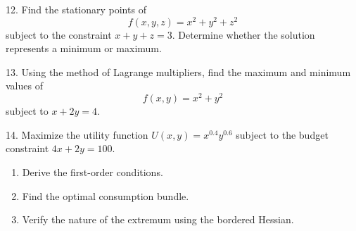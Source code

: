 \documentclass[12pt]{article}
\begin{document}
12. Find the stationary points of
    \[
    f(x, y, z) = x^2 + y^2 + z^2
    \]
    subject to the constraint \(x + y + z = 3.\)
    Determine whether the solution represents a minimum or maximum.

13. Using the method of Lagrange multipliers, find the maximum and minimum values of
    \[
    f(x, y) = x^2 + y^2
    \]
    subject to \(x + 2y = 4.\)

14. Maximize the utility function \(U(x, y) = x^{0.4} y^{0.6}\)  
    subject to the budget constraint \(4x + 2y = 100.\)
    \begin{enumerate}
      \item Derive the first-order conditions.
      \item Find the optimal consumption bundle.
      \item Verify the nature of the extremum using the bordered Hessian.
    \end{enumerate}
\end{document}
